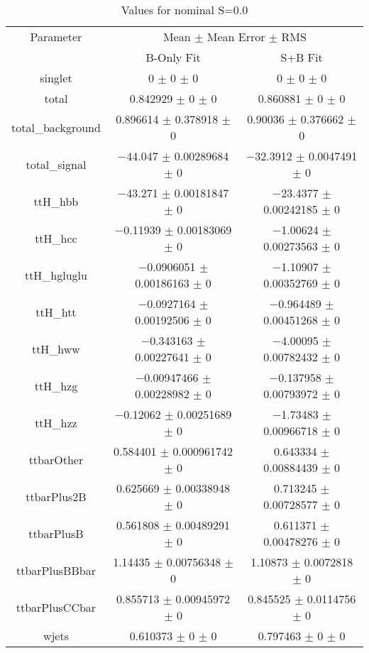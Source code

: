 \begin{table}
\centering
\caption{Values for nominal S=0.0}
\begin{tabular}{ccc}
\toprule
Parameter & \multicolumn{2}{c}{Mean $\pm$ Mean Error $\pm$ RMS}\\
 & B-Only Fit & S+B Fit\\
\midrule
singlet & \num{0} $\pm$ \num{0} $\pm$ \num{0} & \num{0} $\pm$ \num{0} $\pm$ \num{0}\\
total & \num{0.842929} $\pm$ \num{0} $\pm$ \num{0} & \num{0.860881} $\pm$ \num{0} $\pm$ \num{0}\\
total\_background & \num{0.896614} $\pm$ \num{0.378918} $\pm$ \num{0} & \num{0.90036} $\pm$ \num{0.376662} $\pm$ \num{0}\\
total\_signal & \num{-44.047} $\pm$ \num{0.00289684} $\pm$ \num{0} & \num{-32.3912} $\pm$ \num{0.0047491} $\pm$ \num{0}\\
ttH\_hbb & \num{-43.271} $\pm$ \num{0.00181847} $\pm$ \num{0} & \num{-23.4377} $\pm$ \num{0.00242185} $\pm$ \num{0}\\
ttH\_hcc & \num{-0.11939} $\pm$ \num{0.00183069} $\pm$ \num{0} & \num{-1.00624} $\pm$ \num{0.00273563} $\pm$ \num{0}\\
ttH\_hgluglu & \num{-0.0906051} $\pm$ \num{0.00186163} $\pm$ \num{0} & \num{-1.10907} $\pm$ \num{0.00352769} $\pm$ \num{0}\\
ttH\_htt & \num{-0.0927164} $\pm$ \num{0.00192506} $\pm$ \num{0} & \num{-0.964489} $\pm$ \num{0.00451268} $\pm$ \num{0}\\
ttH\_hww & \num{-0.343163} $\pm$ \num{0.00227641} $\pm$ \num{0} & \num{-4.00095} $\pm$ \num{0.00782432} $\pm$ \num{0}\\
ttH\_hzg & \num{-0.00947466} $\pm$ \num{0.00228982} $\pm$ \num{0} & \num{-0.137958} $\pm$ \num{0.00793972} $\pm$ \num{0}\\
ttH\_hzz & \num{-0.12062} $\pm$ \num{0.00251689} $\pm$ \num{0} & \num{-1.73483} $\pm$ \num{0.00966718} $\pm$ \num{0}\\
ttbarOther & \num{0.584401} $\pm$ \num{0.000961742} $\pm$ \num{0} & \num{0.643334} $\pm$ \num{0.00884439} $\pm$ \num{0}\\
ttbarPlus2B & \num{0.625669} $\pm$ \num{0.00338948} $\pm$ \num{0} & \num{0.713245} $\pm$ \num{0.00728577} $\pm$ \num{0}\\
ttbarPlusB & \num{0.561808} $\pm$ \num{0.00489291} $\pm$ \num{0} & \num{0.611371} $\pm$ \num{0.00478276} $\pm$ \num{0}\\
ttbarPlusBBbar & \num{1.14435} $\pm$ \num{0.00756348} $\pm$ \num{0} & \num{1.10873} $\pm$ \num{0.0072818} $\pm$ \num{0}\\
ttbarPlusCCbar & \num{0.855713} $\pm$ \num{0.00945972} $\pm$ \num{0} & \num{0.845525} $\pm$ \num{0.0114756} $\pm$ \num{0}\\
wjets & \num{0.610373} $\pm$ \num{0} $\pm$ \num{0} & \num{0.797463} $\pm$ \num{0} $\pm$ \num{0}\\
\bottomrule
\end{tabular}
\end{table}